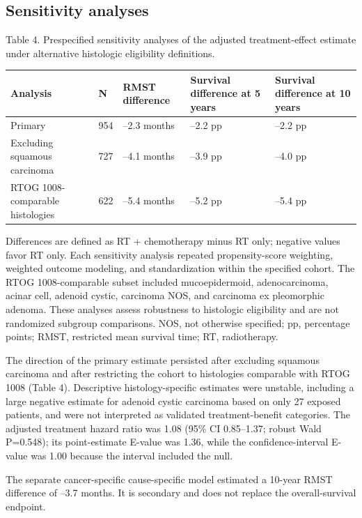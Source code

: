 \documentclass[10pt,twocolumn]{article}
\begin{document}
\subsection{Sensitivity analyses}
Table 4. Prespecified sensitivity analyses of the adjusted treatment-effect estimate under alternative histologic eligibility definitions.\par
\begin{table}[t]
\centering
\scriptsize
\begin{tabularx}{\textwidth}{@{}XXXXX@{}}
\toprule
\textbf{Analysis} & \textbf{N} & \textbf{RMST difference} & \textbf{Survival difference at 5 years} & \textbf{Survival difference at 10 years} \\
\midrule
Primary & 954 & --2.3 months & --2.2 pp & --2.2 pp \\
Excluding squamous carcinoma & 727 & --4.1 months & --3.9 pp & --4.0 pp \\
RTOG 1008-comparable histologies & 622 & --5.4 months & --5.2 pp & --5.4 pp \\
\bottomrule
\end{tabularx}
\end{table}
Differences are defined as RT + chemotherapy minus RT only; negative values favor RT only. Each sensitivity analysis repeated propensity-score weighting, weighted outcome modeling, and standardization within the specified cohort. The RTOG 1008-comparable subset included mucoepidermoid, adenocarcinoma, acinar cell, adenoid cystic, carcinoma NOS, and carcinoma ex pleomorphic adenoma. These analyses assess robustness to histologic eligibility and are not randomized subgroup comparisons. NOS, not otherwise specified; pp, percentage points; RMST, restricted mean survival time; RT, radiotherapy.\par
The direction of the primary estimate persisted after excluding squamous carcinoma and after restricting the cohort to histologies comparable with RTOG 1008 (Table 4). Descriptive histology-specific estimates were unstable, including a large negative estimate for adenoid cystic carcinoma based on only 27 exposed patients, and were not interpreted as validated treatment-benefit categories. The adjusted treatment hazard ratio was 1.08 (95\% CI 0.85--1.37; robust Wald P=0.548); its point-estimate E-value was 1.36, while the confidence-interval E-value was 1.00 because the interval included the null.\par
The separate cancer-specific cause-specific model estimated a 10-year RMST difference of --3.7 months. It is secondary and does not replace the overall-survival endpoint.\par
\end{document}
